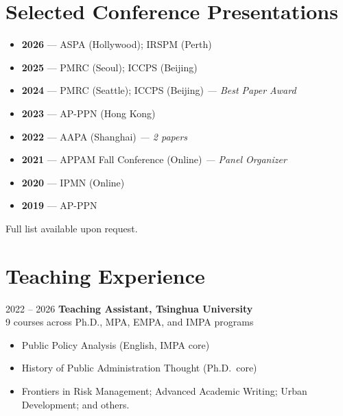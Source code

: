 \documentclass[10pt, a4paper]{article}
\newcommand{\entry}[4]{
  {\color{soft}\small #1} \hfill
  \textbf{#2} \\
  #3 \hfill {\color{soft}\small #4}
}
\begin{document}
\section{Selected Conference Presentations}

\begin{itemize}[leftmargin=2em, itemsep=4pt]
  \item \textbf{2026} --- ASPA (Hollywood); IRSPM (Perth)
  \item \textbf{2025} --- PMRC (Seoul); ICCPS (Beijing)
  \item \textbf{2024} --- PMRC (Seattle); ICCPS (Beijing) \textit{--- Best Paper Award}
  \item \textbf{2023} --- AP-PPN (Hong Kong)
  \item \textbf{2022} --- AAPA (Shanghai) \textit{--- 2 papers}
  \item \textbf{2021} --- APPAM Fall Conference (Online) \textit{--- Panel Organizer}
  \item \textbf{2020} --- IPMN (Online)
  \item \textbf{2019} --- AP-PPN
\end{itemize}

\vspace{4pt}
Full list available upon request.

\section{Teaching Experience}

\entry{2022 -- 2026}
  {Teaching Assistant, Tsinghua University}
  {9 courses across Ph.D., MPA, EMPA, and IMPA programs}
  {}

\vspace{4pt}
\begin{itemize}[leftmargin=2em]
  \item Public Policy Analysis (English, IMPA core)
  \item History of Public Administration Thought (Ph.D.\ core)
  \item Frontiers in Risk Management; Advanced Academic Writing; Urban Development; and others.
\end{itemize}
\end{document}
